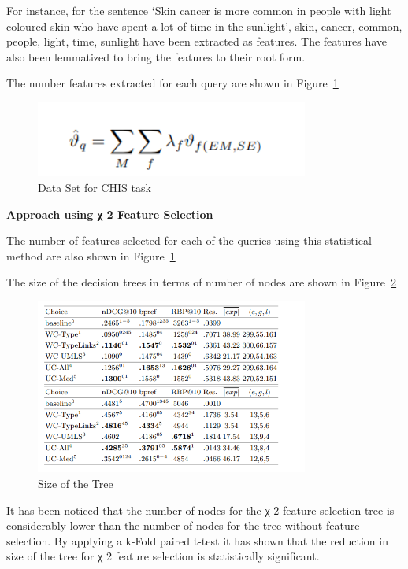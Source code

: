 \documentclass[]{article}
\begin{document}
For instance, for the sentence ‘Skin cancer is more common in people with light coloured skin who have spent a lot of time in the sunlight’, skin, cancer, common, people, light, time, sunlight have been extracted as features. The features have also been lemmatized to bring the features to their root form.

The number features extracted for each query are shown in Figure~\ref{fig27} 

\begin{figure}[b!]
	\includegraphics[width=0.8\textwidth]{Capture27.png}
	\caption{Data Set for CHIS task \label{fig27}}
\end{figure} 

\textbf{Approach using χ 2 Feature Selection}

The number of features selected for each of the queries using this statistical method are also shown in Figure~\ref{fig27} 

The size of the decision trees in terms of number of nodes are shown in Figure~\ref{fig28} 

\begin{figure}[t!]
	\includegraphics[width=0.8\textwidth]{Capture28.png}
	\caption{Size of the Tree\label{fig28}}
\end{figure} 

It has been noticed that the number of nodes for the χ 2 feature selection tree is considerably lower than the number of nodes for the tree without feature selection. By applying a k-Fold paired t-test it has shown that the reduction in size of the tree for χ 2 feature selection is statistically significant. 
\end{document}
